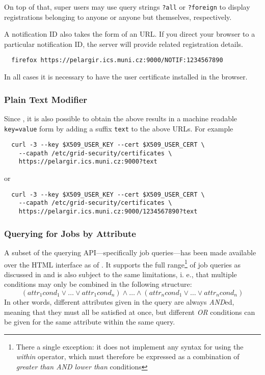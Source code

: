 On top of that, \LB super users may use query strings \texttt{?all} or \texttt{?foreign} to display registrations belonging to anyone or anyone but themselves, respectively.

A notification ID also takes the form of an URL. If you direct your browser to a particular notification ID, the \LB server will provide related registration details.
\begin{verbatim}
  firefox https://pelargir.ics.muni.cz:9000/NOTIF:1234567890
\end{verbatim}
In all cases it is necessary to have the user certificate installed in the browser.

\subsubsection{Plain Text Modifier}
\label{HTML:plaintext}

Since , it is also possible to obtain the above results in a machine readable 
\verb'key=value' form by adding a suffix \verb'text' to the above URLs. For example
\begin{verbatim}
  curl -3 --key $X509_USER_KEY --cert $X509_USER_CERT \
    --capath /etc/grid-security/certificates \ 
    https://pelargir.ics.muni.cz:9000?text
\end{verbatim}
or
\begin{verbatim}
  curl -3 --key $X509_USER_KEY --cert $X509_USER_CERT \
    --capath /etc/grid-security/certificates \ 
    https://pelargir.ics.muni.cz:9000/1234567890?text
\end{verbatim}

\subsubsection{Querying for Jobs by Attribute}
\label{HTML:queries}

A subset of the \LB querying API---specifically job queries---has been made available over the HTML interface as of . It supports the full range\footnote{There a single exception: it does not implement any syntax for using the \emph{within} operator, which must therefore be expressed as a combination of \emph{greater than AND lower than} conditions} of job queries as discussed in \cite{lbdg} and is also subject to the same limitations, i. e., that multiple conditions may only be combined in the following structure:
$$(attr_{1}cond_{1} \vee \dots \vee attr_{1}cond_{n}) \wedge \dots \wedge (attr_{n}cond_{1} \vee \dots \vee attr_{n}cond_{n})$$
In other words, different attributes given in the query are always \emph{AND}ed, meaning that they must all be satisfied at once, but different \emph{OR} conditions can be given for the same attribute within the same query.

